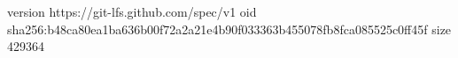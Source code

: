 version https://git-lfs.github.com/spec/v1
oid sha256:b48ca80ea1ba636b00f72a2a21e4b90f033363b455078fb8fca085525c0ff45f
size 429364
